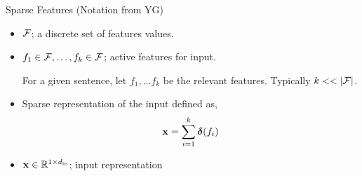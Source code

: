 \documentclass{beamer}
\begin{document}
\begin{frame}{Sparse Features (Notation from YG)}
  \begin{itemize}
   
  \item   $\mathcal{F}$; a discrete set of features values. 
  \item   $f_1\in\mathcal{F}, \ldots , f_k\in\mathcal{F}$; active features for input. 
    
    \air 
    
    For a given sentence, let $f_1, \ldots f_k$  be the relevant features.  Typically $k << |\mathcal{F}|$.

\air

  \item Sparse representation of the input defined as,
    \[\mathbf{x} = \sum_{i=1}^k \boldsymbol{\delta}(f_i) \]
  \item $\mathbf{x} \in \mathbb{R}^{1\times {d_{\mathrm{in}}}}$; input representation 
  \end{itemize}

\end{frame}
\end{document}
